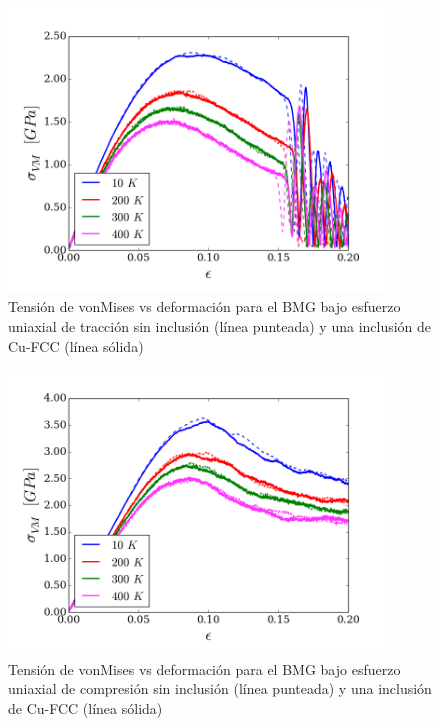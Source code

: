 \documentclass[10pt, oneside]{article} %
\begin{document}
\begin{figure}[H]
\centering
\includegraphics[width=10cm]{../Figures/Cap_4/stress_strain_tension_FCC_NoInc.png}
\caption[vonMises vs deformación en tracción. Inclusión Cu-FCC]{Tensión de vonMises vs deformación para el BMG bajo esfuerzo uniaxial de tracción sin inclusión (línea punteada) y una inclusión de Cu-FCC (línea sólida)}
\label{C4:fg:fcc_vm_tension}
\end{figure}

\begin{figure}[H]
\centering
\includegraphics[width=10cm]{../Figures/Cap_4/stress_strain_compression_FCC_NoInc.png}
\caption[vonMises vs deformación en compresión. Inclusión de Cu-FCC]{Tensión de vonMises vs deformación para el BMG bajo esfuerzo uniaxial de compresión sin inclusión (línea punteada) y una inclusión de Cu-FCC (línea sólida)}
\label{C4:fg:fcc_vm_compression}
\end{figure}
\end{document}

